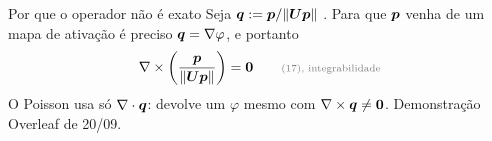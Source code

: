 \begin{frame}{Por que o operador não é exato}
  \small
  Seja $\boldsymbol{q} := \boldsymbol{p}/\|\boldsymbol{U}\boldsymbol{p}\|$ . Para que $\boldsymbol{p}$ venha de um mapa de
  ativação é preciso $\boldsymbol{q} = \nabla\varphi$, e portanto
  \[
    \nabla\times\left(\frac{\p}{\|\U\p\|}\right) = \boldsymbol{0}
    \qquad\text{\nota{(17), integrabilidade}}
  \]
  O Poisson usa só $\nabla\cdot\boldsymbol{q}$: devolve um $\varphi$ mesmo com
      $\nabla\times\boldsymbol{q} \neq \boldsymbol{0}$.
  \vfill
  {\scriptsize\color{gray} Demonstração Overleaf de 20/09.}
\end{frame}
